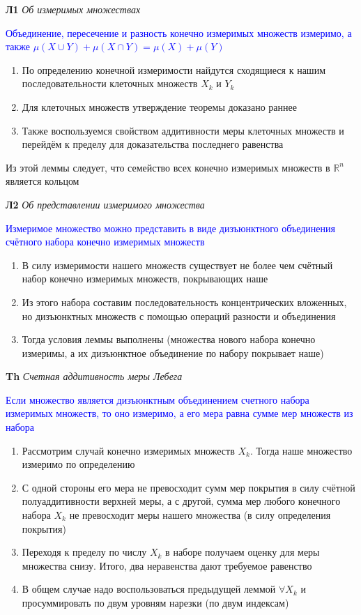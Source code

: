 \textbf{Л1} \textit{Об измеримых множествах}

\textcolor{blue}{Объединение, пересечение и разность конечно измеримых множеств измеримо, а также $\mu (X \cup Y) + \mu (X \cap Y) = \mu (X) + \mu (Y)$}

\begin{enumerate}
    \item По определению конечной измеримости найдутся сходящиеся к нашим последовательности клеточных множеств $X_k$ и $Y_k$
    \item Для клеточных множеств утверждение теоремы доказано раннее
    \item Также воспользуемся свойством аддитивности меры клеточных множеств и перейдём к пределу для доказательства
    последнего равенства
\end{enumerate}

Из этой леммы следует, что семейство всех конечно измеримых множеств в $\mathbb{R}^n$ является кольцом

\textbf{Л2} \textit{Об представлении измеримого множества}

\textcolor{blue}{Измеримое множество можно представить в виде дизъюнктного объединения счётного набора конечно измеримых множеств}

\begin{enumerate}
    \item В силу измеримости нашего множеств существует не более чем счётный набор конечно измеримых множеств, покрывающих наше
    \item Из этого набора составим последовательность концентрических вложенных, но дизъюнктных множеств с помощью операций разности и объединения
    \item Тогда условия леммы выполнены (множества нового набора конечно измеримы, а их дизъюнктное объединение по набору покрывает наше)
\end{enumerate}

\textbf{Th} \textit{Счетная аддитивность меры Лебега}

\textcolor{blue}{Если множество является дизъюнктным объединением счетного набора измеримых множеств, то оно
измеримо, а его мера равна сумме мер множеств из набора}

\begin{enumerate}
    \item Рассмотрим случай конечно измеримых множеств $X_k$.
    Тогда наше множество измеримо по определению
    \item С одной стороны его мера не превосходит сумм мер покрытия в силу счётной полуаддитивности верхней меры, а
    с другой, сумма мер любого конечного набора $X_k$ не превосходит меры нашего множества (в силу определения покрытия)
    \item Переходя к пределу по числу $X_k$ в наборе получаем оценку для меры множества снизу.
    Итого, два неравенства дают требуемое равенство
    \item В общем случае надо воспользоваться предыдущей леммой $\forall X_k$ и просуммировать по двум уровням нарезки (по двум индексам)
\end{enumerate}


